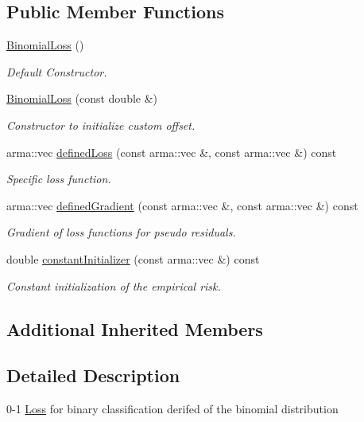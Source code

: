 \subsection*{Public Member Functions}
\begin{DoxyCompactItemize}
\item 
\hyperlink{classloss_1_1_binomial_loss_ab903b1364d0569c83b4f44d8c7af0f69}{Binomial\+Loss} ()
\begin{DoxyCompactList}\small\item\em Default Constructor. \end{DoxyCompactList}\item 
\hyperlink{classloss_1_1_binomial_loss_aac60ad4791933f54fb9858e8d89ba6a5}{Binomial\+Loss} (const double \&)
\begin{DoxyCompactList}\small\item\em Constructor to initialize custom offset. \end{DoxyCompactList}\item 
arma\+::vec \hyperlink{classloss_1_1_binomial_loss_aa4570a731257ba43b1b4d6099c0a4515}{defined\+Loss} (const arma\+::vec \&, const arma\+::vec \&) const
\begin{DoxyCompactList}\small\item\em Specific loss function. \end{DoxyCompactList}\item 
arma\+::vec \hyperlink{classloss_1_1_binomial_loss_a47a27e1be3e7f2c275046b42557ca21a}{defined\+Gradient} (const arma\+::vec \&, const arma\+::vec \&) const
\begin{DoxyCompactList}\small\item\em Gradient of loss functions for pseudo residuals. \end{DoxyCompactList}\item 
double \hyperlink{classloss_1_1_binomial_loss_a1292422a2b07c8ebe1b168375940b029}{constant\+Initializer} (const arma\+::vec \&) const
\begin{DoxyCompactList}\small\item\em Constant initialization of the empirical risk. \end{DoxyCompactList}\end{DoxyCompactItemize}
\subsection*{Additional Inherited Members}


\subsection{Detailed Description}
0-\/1 \hyperlink{classloss_1_1_loss}{Loss} for binary classification derifed of the binomial distribution 

